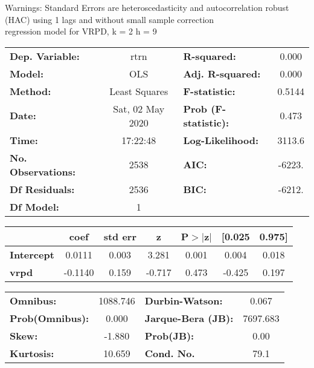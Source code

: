 Warnings: \newline
 [1] Standard Errors are heteroscedasticity and autocorrelation robust (HAC) using 1 lags and without small sample correction\\ 

regression model for VRPD, k = 2 h = 9\begin{center}
\begin{tabular}{lclc}
\toprule
\textbf{Dep. Variable:}    &       rtrn       & \textbf{  R-squared:         } &     0.000   \\
\textbf{Model:}            &       OLS        & \textbf{  Adj. R-squared:    } &     0.000   \\
\textbf{Method:}           &  Least Squares   & \textbf{  F-statistic:       } &    0.5144   \\
\textbf{Date:}             & Sat, 02 May 2020 & \textbf{  Prob (F-statistic):} &    0.473    \\
\textbf{Time:}             &     17:22:48     & \textbf{  Log-Likelihood:    } &    3113.6   \\
\textbf{No. Observations:} &        2538      & \textbf{  AIC:               } &    -6223.   \\
\textbf{Df Residuals:}     &        2536      & \textbf{  BIC:               } &    -6212.   \\
\textbf{Df Model:}         &           1      & \textbf{                     } &             \\
\bottomrule
\end{tabular}
\begin{tabular}{lcccccc}
                   & \textbf{coef} & \textbf{std err} & \textbf{z} & \textbf{P$> |$z$|$} & \textbf{[0.025} & \textbf{0.975]}  \\
\midrule
\textbf{Intercept} &       0.0111  &        0.003     &     3.281  &         0.001        &        0.004    &        0.018     \\
\textbf{vrpd}      &      -0.1140  &        0.159     &    -0.717  &         0.473        &       -0.425    &        0.197     \\
\bottomrule
\end{tabular}
\begin{tabular}{lclc}
\textbf{Omnibus:}       & 1088.746 & \textbf{  Durbin-Watson:     } &    0.067  \\
\textbf{Prob(Omnibus):} &   0.000  & \textbf{  Jarque-Bera (JB):  } & 7697.683  \\
\textbf{Skew:}          &  -1.880  & \textbf{  Prob(JB):          } &     0.00  \\
\textbf{Kurtosis:}      &  10.659  & \textbf{  Cond. No.          } &     79.1  \\
\bottomrule
\end{tabular}
\end{center}

